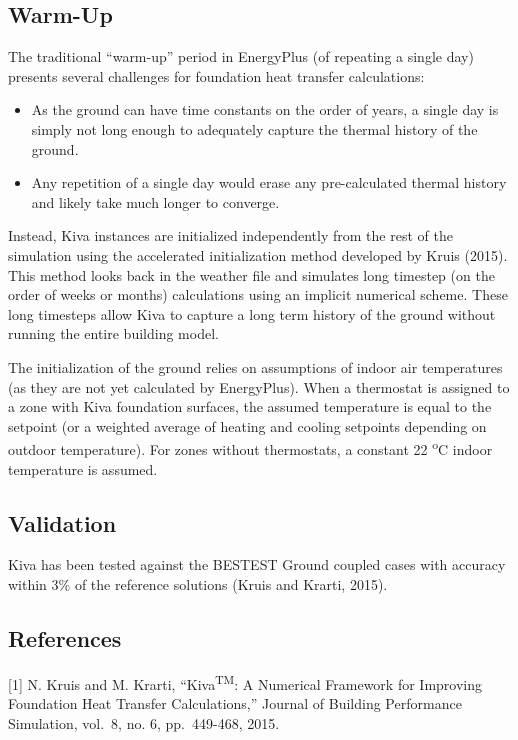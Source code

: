 \subsection{Warm-Up}

The traditional ``warm-up'' period in EnergyPlus (of repeating a single
day) presents several challenges for foundation heat transfer
calculations:

\begin{itemize}
\tightlist
\item
  As the ground can have time constants on the order of years, a single
  day is simply not long enough to adequately capture the thermal
  history of the ground.
\item
  Any repetition of a single day would erase any pre-calculated thermal
  history and likely take much longer to converge.
\end{itemize}

Instead, Kiva instances are initialized independently from the rest of the simulation using the accelerated initialization method developed by Kruis (2015). This method looks back in the weather file and simulates long timestep (on the order of weeks or months) calculations using an implicit numerical scheme. These long timesteps allow Kiva to capture a long term history of the ground without running the entire building model.

The initialization of the ground relies on assumptions of indoor air temperatures (as they are not yet calculated by EnergyPlus). When a thermostat is assigned to a zone with Kiva foundation surfaces, the assumed temperature is equal to the setpoint (or a weighted average of heating and cooling setpoints depending on outdoor temperature). For zones without thermostats, a constant 22 \textsuperscript{o}C indoor temperature is assumed.

\subsection{Validation}

Kiva has been tested against the BESTEST Ground coupled cases with
accuracy within 3\% of the reference solutions (Kruis and Krarti, 2015).

\subsection{References}

{[}1{]} N. Kruis and M. Krarti, ``Kiva\textsuperscript{TM}: A Numerical
Framework for Improving Foundation Heat Transfer Calculations,'' Journal
of Building Performance Simulation, vol.~8, no. 6, pp.~449-468, 2015.

